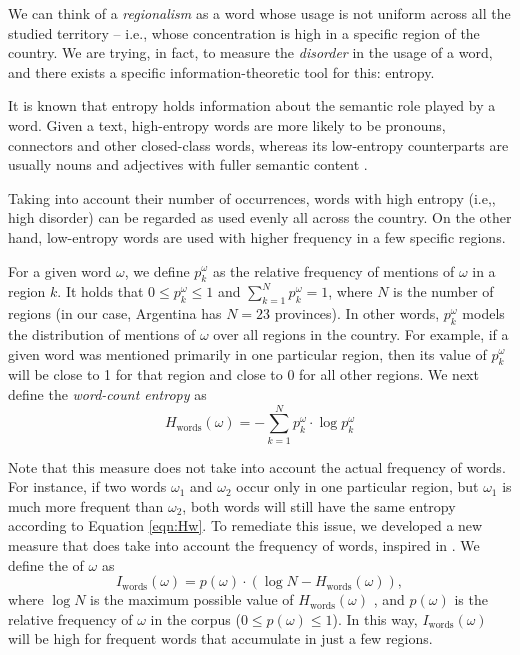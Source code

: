 We can think of a \emph{regionalism} as a word whose usage is not uniform across all the studied territory -- i.e., whose concentration is high in a specific region of the country. We are trying, in fact, to measure the \textit{disorder} in the usage of a word, and there exists a specific information-theoretic tool for this: entropy.

It is known that entropy holds information about the semantic role played by a word. Given a text, high-entropy words are more likely to be pronouns, connectors and other closed-class words, whereas its low-entropy counterparts are usually nouns and adjectives with fuller semantic content \cite{montemurro2002entropic, montemurro2010towards}. 

Taking into account their number of occurrences, words with high entropy (i.e,, high disorder) can be regarded as used evenly all across the country. On the other hand, low-entropy words are used with higher frequency in a few specific regions.

For a given word $\omega$, we define $p_k^\omega$ as the relative frequency of mentions of $\omega$ in a region $k$. It holds that $0 \leq p_k^\omega \leq 1$ and $\sum_{k=1}^N p_k^\omega = 1$, where $N$ is the number of regions (in our case, Argentina has $N=23$ provinces).
In other words, $p_k^\omega$ models the distribution of mentions of $\omega$ over all regions in the country. For example, if a given word was mentioned primarily in one particular region, then its value of $p_k^\omega$ will be close to 1 for that region and close to 0 for all other regions. 
We next define the \emph{word-count entropy} as
\begin{equation}
    H_\text{words}(\omega) = -\sum \limits_{k=1}^{N} p_k^{\omega} \cdot \log p_k^\omega
    \label{eqn:Hw}
\end{equation}

Note that this measure does not take into account the actual frequency of words. For instance, if two words $\omega_1$ and $\omega_2$ occur only in one particular region, but $\omega_1$ is much more frequent than $\omega_2$, both words will still have the same entropy according to Equation \ref{eqn:Hw}.
To remediate this issue, we developed a new measure that does take into account the frequency of words, inspired in \citet{montemurro2010towards}. We define the \wordmetric{} of $\omega$ as
\begin{equation}
  \label{eqn:iv_words}
  I_\text{words}(\omega) = p(\omega) \cdot (\log N  - H_\text{words}(\omega)),
\end{equation}
where $\log N$ is the maximum possible value of $H_\text{words}(\omega)$ \cite{shannon2001mathematical}, and $p(\omega)$ is the relative frequency of $\omega$ in the corpus ($0 \leq p(\omega) \leq 1$). In this way, $I_\text{words}(\omega)$ will be high for frequent words that accumulate in just a few regions.

